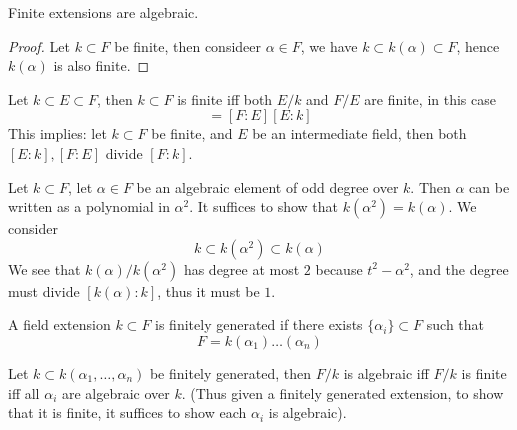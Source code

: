 \documentclass[openany]{book}
\begin{document}
\begin{prop}
    Finite extensions are algebraic.
\end{prop}
\begin{proof}
    Let $k\subset F$ be finite, then consideer $\alpha\in F$, we have $k\subset k(\alpha)\subset F$, hence $k(\alpha)$ is also finite.
\end{proof}



\begin{prop}
    Let $k\subset E\subset F$, then $k\subset F$ is finite iff both $E/k$ and $F/E$ are finite, in this case 
    \begin{equation*}
        [F:k]=[F:E][E:k]
    \end{equation*}
    This implies: let $k\subset F$ be finite, and $E$ be an intermediate field, then both $[E:k],[F:E]$ divide $[F:k]$.
\end{prop}


\begin{example}
    Let $k\subset F$, let $\alpha\in F$ be an algebraic element of odd degree over $k$. Then $\alpha$ can be written as a polynomial in $\alpha^2$. It suffices to show that $k(\alpha^2)=k(\alpha)$. We consider 
    \begin{equation*}
        k\subset k(\alpha^2)\subset k(\alpha)
    \end{equation*}
    We see that $k(\alpha)/k(\alpha^2)$ has degree at most $2$ because $t^2-\alpha^2$, and the degree must divide $[k(\alpha):k]$, thus it must be $1$.
\end{example}


\begin{defn}
    A field extension $k\subset F$  is finitely generated if there exists $\{\alpha_i\}\subset F$ such that 
    \begin{equation*}
        F=k(\alpha_1)\dots(\alpha_n)
    \end{equation*}
\end{defn}


\begin{prop}
    Let $k\subset k(\alpha_1,\dots,\alpha_n)$ be finitely generated, then
    $F/k$ is algebraic iff $F/k$ is finite iff all $\alpha_i$ are algebraic over $k$. (Thus given a finitely generated extension, to show that it is finite, it suffices to show each $\alpha_i$ is algebraic).
\end{prop}
\end{document}
